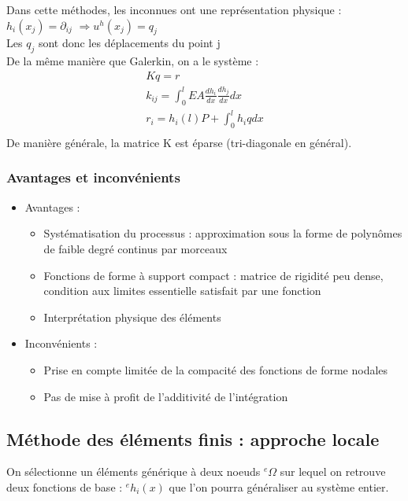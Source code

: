 \documentclass[../main.tex]{subfiles}
\begin{document}
Dans cette méthodes, les inconnues ont une représentation physique : $h_i(x_j) = \partial_{ij}$ $\Rightarrow u^h(x_j) = q_j$\\
Les $q_j$ sont donc les déplacements du point j\\

De la même manière que Galerkin, on a le système : \begin{equation}\begin{gathered}
    Kq = r\\
    k_{ij} = \int_0^l EA \frac{dh_i}{dx} \frac{dh_j}{dx}dx\\
    r_i = h_i(l)P + \int_0^l h_iqdx\\
    \end{gathered}
\end{equation}
De manière générale, la matrice K est éparse (tri-diagonale en général).\\

\subsubsection{Avantages et inconvénients}
\begin{itemize}
    \item Avantages : \begin{itemize}
        \item Systématisation du processus : approximation sous la forme de polynômes de faible degré continus par morceaux\\
        \item Fonctions de forme à support compact : matrice de rigidité peu dense, condition aux limites essentielle satisfait par une fonction\\
        \item Interprétation physique des éléments\\
    \end{itemize}
    \item Inconvénients :\begin{itemize}
        \item Prise en compte limitée de la compacité des fonctions de forme nodales\\
        \item Pas de mise à profit de l'additivité de l'intégration\\
    \end{itemize}
\end{itemize}

\subsection{Méthode des éléments finis : approche locale}
On sélectionne un éléments générique à deux noeuds $^e\Omega$ sur lequel on retrouve deux fonctions de base : ${}^eh_i(x)$ que l'on pourra généraliser au système entier.\\
\end{document}
